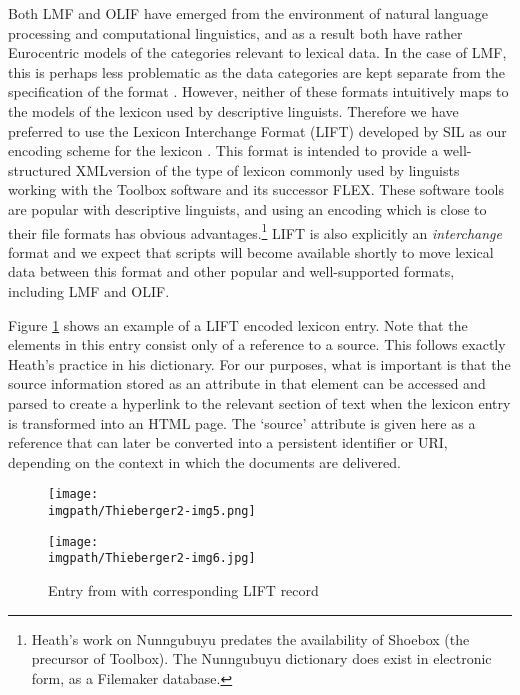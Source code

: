 Both LMF and OLIF have emerged from the environment of natural language processing and computational linguistics, and as a result both have rather Eurocentric models of the categories relevant to lexical data. In the case of LMF, this is perhaps less problematic as the data categories are kept separate from the specification of the format \citep[16]{Maxwell2008}. However, neither of these formats intuitively maps to the models of the lexicon used by descriptive linguists. Therefore we have preferred to use the Lexicon Interchange Format (LIFT) developed by SIL as our encoding scheme for the lexicon \citep{Hosken2006}. This format is intended to provide a well-structured XMLversion of the type of lexicon commonly used by linguists working with the Toolbox software and its successor FLEX. These software tools are popular with descriptive linguists, and using an encoding which is close to their file formats has obvious advantages.\footnote{Heath's 
 work on Nunngubuyu predates the availability of Shoebox (the precursor of Toolbox). The Nunngubuyu dictionary does exist in electronic form, as a Filemaker database.
} 
LIFT is also explicitly an \textit{interchange} format and we expect that scripts will become available shortly to move lexical data between this format and other popular and well-supported formats, including LMF and OLIF.

Figure \ref{thi:fig:fig2} shows an example of a LIFT encoded lexicon entry. Note that the   elements in this entry consist only of a reference to a source. This follows exactly Heath's practice in his dictionary. For our purposes, what is important is that the source information stored as an attribute in that element can be accessed and parsed to create a hyperlink to the relevant section of text when the lexicon entry is transformed into an HTML page. The `source' attribute is given here as a reference that can later be converted into a persistent identifier or URI, depending on the context in which the documents are delivered.

\begin{figure}
\texttt{[image: \\imgpath/Thieberger2-img5.png]}

\texttt{[image: \\imgpath/Thieberger2-img6.jpg]}
\caption{Entry from \citet{Heath1982} with corresponding LIFT record} %
%
\label{thi:fig:fig2}
\end{figure}

